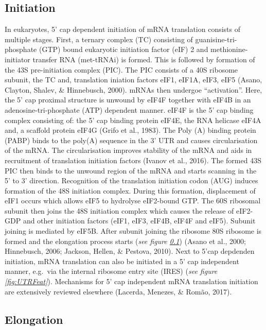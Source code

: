 \documentclass[12pt,openany]{book}
\begin{document}
\clearpage

\subsection{Initiation} \label{initiation}

In eukaryotes, 5' cap dependent initiation of mRNA translation consists
of multiple stages. First, a ternary complex (TC) consisting of
guanisine-tri-phosphate (GTP) bound eukaryotic initiation factor (eIF) 2
and methionine-initiator transfer RNA (met-tRNAi) is formed. This is
followed by formation of the 43S pre-initiation complex (PIC). The PIC
consists of a 40S ribosome subunit, the TC and, translation iniation
factors eIF1, eIF1A, eIF3, eIF5 (Asano, Clayton, Shalev, \& Hinnebusch,
2000). mRNAs then undergoe ``activation''. Here, the 5' cap proximal
structure is unwound by eIF4F together with eIF4B in an
adenosine-tri-phosphate (ATP) dependent manner. eIF4F is the 5' cap
binding complex consisting of: the 5' cap binding protein eIF4E, the RNA
helicase eIF4A and, a scaffold protein eIF4G (Grifo et al., 1983). The
Poly (A) binding protein (PABP) binds to the poly(A) sequence in the 3'
UTR and causes circularisation of the mRNA. The circularisation improves
stability of the mRNA and aids in recruitment of translation initiation
factors (Ivanov et al., 2016). The formed 43S PIC then binds to the
unwound region of the mRNA and starts scanning in the 5' to 3'
direction. Recognition of the translation initiation codon (AUG) induces
formation of the 48S initiation complex. During this formation,
displacement of eIF1 occurs which allows eIF5 to hydrolyse eIF2-bound
GTP. The 60S ribosomal subunit then joins the 48S initiation complex
which causes the release of eIF2-GDP and other initiation factors (eIF1,
eIF3, eIF4B, eIF4F and eIF5). Subunit joining is mediated by eIF5B.
After subunit joining the ribosome 80S ribosome is formed and the
elongation process starts (\emph{see figure \ref{initiation}}) (Asano et
al., 2000; Hinnebusch, 2006; Jackson, Hellen, \& Pestova, 2010). Next to
5'cap depdenden initiation, mRNA translation can also be initiated in a
5' cap independent manner, e.g.~via the internal ribosome entry site
(IRES) (\emph{see figure \ref{fig:UTRFeat}}). Mechanisms for 5' cap
independent mRNA translation initiation are extensively reviewed
elsewhere (Lacerda, Menezes, \& Romão, 2017).

\subsection{Elongation} \label{elongation}
\end{document}
